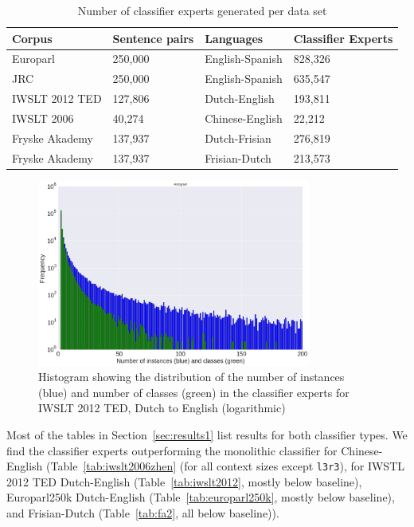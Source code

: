 \documentclass[smallextended]{svjour3}       %
\theoremstyle{break}
\begin{document}
\begin{table}
\begin{center}
\begin{tabular}{|lll|l|}
\hline
\textbf{Corpus} & \textbf{Sentence pairs} & \textbf{Languages} & \textbf{Classifier Experts} \\
\hline
Europarl & 250,000 & English-Spanish & 828,326 \\
JRC & 250,000 & English-Spanish & 635,547 \\
IWSLT 2012 TED & 127,806 & Dutch-English & 193,811 \\
IWSLT 2006 & 40,274 & Chinese-English & 22,212 \\
Fryske Akademy & 137,937 & Dutch-Frisian & 276,819 \\
Fryske Akademy & 137,937 & Frisian-Dutch & 213,573 \\
\hline
\end{tabular}
\caption{Number of classifier experts generated per data set}
\label{tab:expertcount}
\end{center}
\end{table}


\begin{figure}
\begin{center}
\includegraphics[width=90.00mm]{classifierhistogram.png}
\caption{Histogram showing the distribution of the number of instances (blue) and number of classes (green) in the classifier experts for IWSLT 2012 TED, Dutch to English (logarithmic)}
\label{fig:histogram}
\end{center}
\end{figure}

Most of the tables in Section~\ref{sec:results1} list results for both classifier
types.  We find the classifier experts outperforming the monolithic classifier
for Chinese-English (Table~\ref{tab:iwslt2006zhen} (for all context sizes except
\texttt{l3r3}), for  IWSTL 2012 TED Dutch-English (Table~\ref{tab:iwslt2012},
mostly below baseline), Europarl250k Dutch-English
(Table~\ref{tab:europarl250k}, mostly below baseline), and Frisian-Dutch
(Table~\ref{tab:fa2}, all below baseline)).
\end{document}
